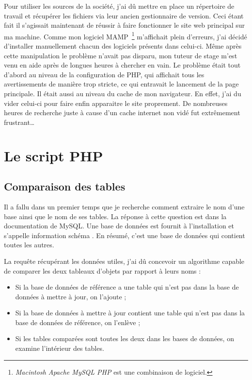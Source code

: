 Pour utiliser les sources de la société, j'ai dû mettre en place un
répertoire de travail et récupérer les fichiers via leur ancien
gestionnaire de version. Ceci étant fait il s'agissait maintenant de
réussir à faire fonctionner le site web principal sur ma machine. Comme
mon logiciel MAMP\, \footnote{\emph{Macintosh Apache MySQL PHP} est une
combinaison de logiciel.} m'affichait plein d'erreurs, j'ai décidé
d'installer manuellement chacun des logiciels présents dans celui-ci.
Même après cette manipulation le problème n'avait pas disparu, mon
tuteur de stage m'est venu en aide après de longues heures à chercher en
vain. Le problème était tout d'abord au niveau de la configuration de
PHP, qui affichait tous les avertissements de manière trop stricte, ce
qui entravait le lancement de la page principale. Il était aussi au
niveau du cache de mon navigateur. En effet, j'ai du vider celui-ci pour
faire enfin apparaitre le site proprement. De nombreuses heures de
recherche juste à cause d'un cache internet non vidé fut extrêmement
frustrant\dots

\section{Le script PHP} %
\label{sec:Le script PHP}

\subsection{Comparaison des tables} %
\label{sub:Comparaison des tables}

Il a fallu dans un premier temps que je recherche comment extraire le
nom d'une base ainsi que le nom de ses tables. La réponse à cette
question est dans la documentation de MySQL. Une base de données est
fournit à l'installation et s'appelle \og information schéma \fg{} . En
résumé, c'est une base de données qui contient toutes les autres.

La requête récupérant les données utiles, j'ai dû concevoir un
algorithme capable de comparer les deux tableaux d'objets par rapport à
leurs noms :

\begin{itemize}
    \item Si la base de données de référence a une table qui n'est pas
    dans la base de données à mettre à jour, on l'ajoute ;
    \item Si la base de données à mettre à jour contient une table qui
    n'est pas dans la base de données de référence, on l'enlève ;
    \item Si les tables comparées sont toutes les deux dans les bases de
    données, on examine l'intérieur des tables.
\end{itemize}

